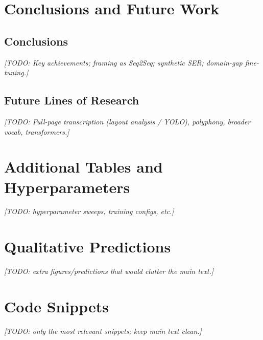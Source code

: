 \documentclass[11pt, a4paper]{report}
\begin{document}
\chapter{Conclusions and Future Work}
\label{ch:conclusions}
\section{Conclusions}
\textit{[TODO: Key achievements; framing as Seq2Seq; synthetic SER; domain-gap fine-tuning.]}

\section{Future Lines of Research}
\textit{[TODO: Full-page transcription (layout analysis / YOLO), polyphony, broader vocab, transformers.]}


\cleardoublepage
\printbibliography[heading=bibintoc, title={References}]

\appendix
\chapter{Additional Tables and Hyperparameters}
\textit{[TODO: hyperparameter sweeps, training configs, etc.]}

\chapter{Qualitative Predictions}
\textit{[TODO: extra figures/predictions that would clutter the main text.]}

\chapter{Code Snippets}
\textit{[TODO: only the most relevant snippets; keep main text clean.]}
\end{document}
